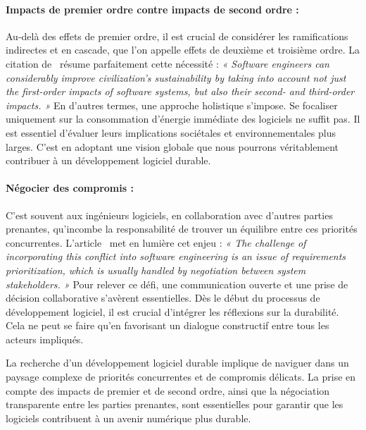 \paragraph{Impacts de premier ordre contre impacts de second ordre :}
Au-delà des effets de premier ordre, il est crucial de considérer les ramifications indirectes et en cascade, que l'on appelle effets de deuxième et troisième ordre. La citation de~\cite{SafetySecuritySustainability} résume parfaitement cette nécessité : \emph{« Software engineers can considerably improve civilization’s sustainability by taking into account not just the first-order impacts of software systems, but also their second- and third-order impacts. »} En d'autres termes, une approche holistique s'impose. Se focaliser uniquement sur la consommation d'énergie immédiate des logiciels ne suffit pas. Il est essentiel d'évaluer leurs implications sociétales et environnementales plus larges. C'est en adoptant une vision globale que nous pourrons véritablement contribuer à un développement logiciel durable.

\paragraph{Négocier des compromis :}
C'est souvent aux ingénieurs logiciels, en collaboration avec d'autres parties prenantes, qu'incombe la responsabilité de trouver un équilibre entre ces priorités concurrentes. L'article~\cite{SafetySecuritySustainability} met en lumière cet enjeu : \emph{« The challenge of incorporating this conflict into software engineering is an issue of requirements prioritization, which is usually handled by negotiation between system stakeholders. »} Pour relever ce défi, une communication ouverte et une prise de décision collaborative s'avèrent essentielles. Dès le début du processus de développement logiciel, il est crucial d'intégrer les réflexions sur la durabilité. Cela ne peut se faire qu'en favorisant un dialogue constructif entre tous les acteurs impliqués.


La recherche d'un développement logiciel durable implique de naviguer dans un paysage complexe de priorités concurrentes et de compromis délicats. La prise en compte des impacts de premier et de second ordre, ainsi que la négociation transparente entre les parties prenantes, sont essentielles pour garantir que les logiciels contribuent à un avenir numérique plus durable.


